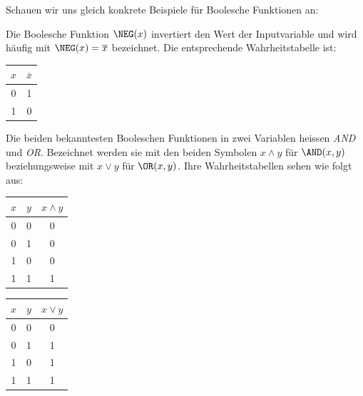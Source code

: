Schauen wir uns gleich konkrete Beispiele für Boolesche Funktionen an:
\begin{myexample}\label{myexample:BoolscheOperationen}
    Die Boolesche Funktion $\NEG(x)$ invertiert den Wert der Inputvariable und wird häufig mit $\NEG(x)=\overline{x}$ bezeichnet. Die entsprechende Wahrheitstabelle ist:
    \begin{center}
        \begin{tabular}{ c||c } 
        $x$ & $\overline{x}$ \\
        \hline
        0&1\\
        1&0
        \end{tabular}
    \end{center}
    Die beiden bekanntesten Booleschen Funktionen in zwei Variablen heissen \emph{AND} und \emph{OR}. Bezeichnet werden sie mit den beiden Symbolen $x \wedge y$ für $\AND(x,y)$ beziehungsweise mit $x \vee y$ für $\OR(x,y)$. Ihre Wahrheitstabellen sehen wie folgt aus:
    \begin{center}
        \begin{tabular}{c|c||c}
            $x$ & $y$ & $x\wedge y$ \\
            \hline
            0 & 0 & 0 \\
            0&1&0 \\
            1&0&0\\
            1&1&1
        \end{tabular}
            \quad
        \begin{tabular}{c|c||c}
            $x$ & $y$ & $x \vee y$ \\
            \hline
            0 & 0 & 0 \\
            0&1&1 \\
            1&0&1\\
            1&1&1
        \end{tabular}  
    \end{center}
\end{myexample}

